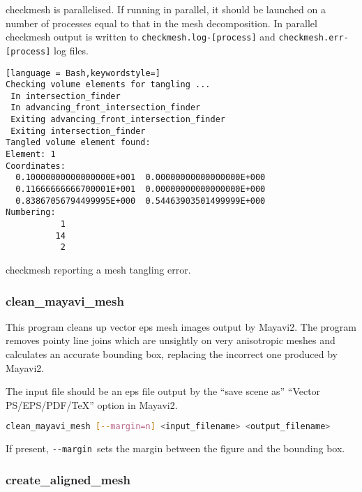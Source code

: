 checkmesh is parallelised. If running in parallel, it should be launched on a number of processes equal to that in the mesh decomposition. In parallel checkmesh output is written to
\lstinline[language = Bash]+checkmesh.log-[process]+ and \lstinline[language = Bash]+checkmesh.err-[process]+ log files.

\begin{example}
\begin{lstlisting}[language = Bash,keywordstyle=]
Checking volume elements for tangling ...
 In intersection_finder
 In advancing_front_intersection_finder
 Exiting advancing_front_intersection_finder
 Exiting intersection_finder
Tangled volume element found: 
Element: 1
Coordinates:
  0.10000000000000000E+001  0.00000000000000000E+000
  0.11666666666700001E+001  0.00000000000000000E+000
  0.83867056794499995E+000  0.54463903501499999E+000
Numbering:
           1
          14
           2
\end{lstlisting}
\caption{checkmesh reporting a mesh tangling error.}
\end{example}


\subsubsection{clean\_mayavi\_mesh}
\label{sec:clean_mayavi_mesh}

This program cleans up vector eps mesh images output by Mayavi2. The program
removes pointy line joins which are unsightly on very anisotropic meshes and
calculates an accurate bounding box, replacing the incorrect one produced by Mayavi2.

The input file should be an eps file output by the ``save scene as'' 
``Vector PS/EPS/PDF/TeX'' option in Mayavi2.

\begin{lstlisting}[language = Bash]
clean_mayavi_mesh [--margin=n] <input_filename> <output_filename>
\end{lstlisting}

If present, \lstinline[language = Bash]+--margin+\ sets the margin between
the figure and the bounding box. 


\subsubsection{create\_aligned\_mesh}
\label{sec:create_aligned_mesh}

